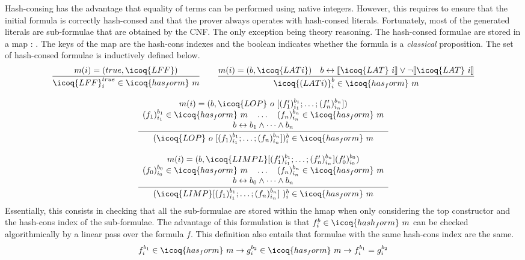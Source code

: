 \documentclass[a4paper,UKenglish,cleveref, autoref, thm-restate]{lipics-v2019}
\begin{document}
Hash-consing has the advantage that equality of terms can be performed
using native integers. However, this requires to ensure that the
initial formula is correctly hash-consed and that the prover always
operates with hash-consed literals. Fortunately, most of the generated
literals are sub-formulae that are obtained by the CNF. The only
exception being theory reasoning.
%
The hash-consed formulae are stored in a map  :
.  The keys of the map are the hash-cons indexes
and the boolean indicates whether the formula is a \emph{classical}
proposition. The set of hash-consed formulae  is
inductively defined below.
\[
  \begin{array}{c}
  \dfrac{m(i) = (true,\icoq{LFF})}
  {\icoq{LFF}_i^{true} \in \icoq{has_form}\ m }
  \qquad
  \dfrac{m(i) = (b,\icoq{LAT i}) \quad b \leftrightarrow \llbracket \icoq{LAT}\ i \rrbracket \lor \neg \llbracket \icoq{LAT}\ i \rrbracket }
  {\icoq{(LAT i)}_i^b \in \icoq{has_form}\ m }\\
    \\
    \dfrac{
    \begin{array}{c}
      m(i) = (b,\icoq{LOP}\ o\ [(f'_1)_{i_1}^{b_1} ; \dots ; (f'_n)_{i_n}^{b_n}]) \\
      (f_1)_{i_1}^{b_1} \in \icoq{has_form}\ m \quad \dots \quad (f_n)_{i_n}^{b_n} \in  \icoq{has_form}\ m\\
      b \leftrightarrow b_1 \land \dots \land b_n
    \end{array}}
    {(\icoq{LOP}\ o\  [(f_1)_{i_1}^{b_1}; \dots ; (f_n)_{i_n}^{b_n}])_i^b \in  \icoq{has_form}\ m
    }\\
    \\
    \dfrac{
    \begin{array}{c}
      m(i) = (b,\icoq{LIMPL} [(f'_1)_{i_1}^{b_1} ; \dots ; (f'_n)_{i_n}^{b_n}] (f'_0)_{i_0}^{b_0}) \\
      (f_0)_{i_0}^{b_0} \in \icoq{has_form}\ m \quad \dots \quad (f_n)_{i_n}^{b_n} \in  \icoq{has_form}\ m\\
      b \leftrightarrow b_0 \land \dots \land b_n
    \end{array}}
    {(\icoq{LIMP} [(f_1)_{i_1}^{b_1}; \dots ; (f_n)_{i_n}^{b_n}]\ )_i^b \in  \icoq{has_form}\ m
    }
  \end{array}    
\]
Essentially, this consists in checking that all the sub-formulae are
stored within the hmap  when only considering the top
constructor and the hash-cons index of the sub-formulae.
%
The advantage of this formulation is that
$f_i^b \in \icoq{hash_form}\ m$ can be checked algorithmically by a
linear pass over the formula $f$.
%
This definition also entails that formulae with the same hash-cons index are the same.
\[
f_i^{b_1} \in \icoq{has_form}\ m \to g_i^{b_2} \in \icoq{has_form}\ m \to  f_i^{b_1} = g_i^{b_2}
\]
\end{document}
